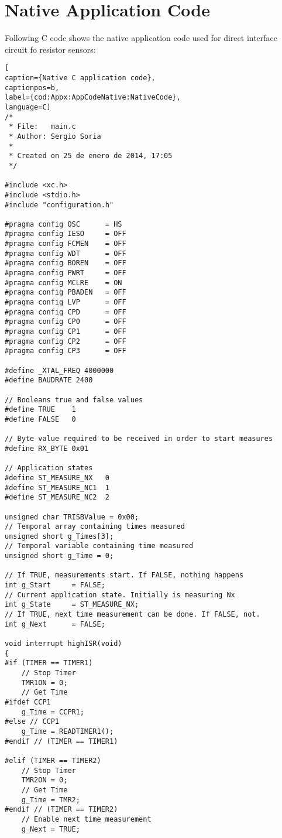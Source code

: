 \chapter{Native Application Code}\label{Appx:AppCodeNative}
Following C code shows the native application code used for direct interface circuit fo resistor sensors:
\medskip
\begin{lstlisting}[
caption={Native C application code},
captionpos=b,
label={cod:Appx:AppCodeNative:NativeCode},
language=C]
/*
 * File:   main.c
 * Author: Sergio Soria
 *
 * Created on 25 de enero de 2014, 17:05
 */

#include <xc.h>
#include <stdio.h>
#include "configuration.h"

#pragma config OSC      = HS
#pragma config IESO     = OFF
#pragma config FCMEN    = OFF
#pragma config WDT      = OFF
#pragma config BOREN    = OFF
#pragma config PWRT     = OFF
#pragma config MCLRE    = ON
#pragma config PBADEN   = OFF
#pragma config LVP      = OFF
#pragma config CPD      = OFF
#pragma config CP0      = OFF
#pragma config CP1      = OFF
#pragma config CP2      = OFF
#pragma config CP3      = OFF

#define _XTAL_FREQ 4000000
#define BAUDRATE 2400

// Booleans true and false values
#define TRUE    1
#define FALSE   0

// Byte value required to be received in order to start measures
#define RX_BYTE 0x01

// Application states
#define ST_MEASURE_NX   0
#define ST_MEASURE_NC1  1
#define ST_MEASURE_NC2  2

unsigned char TRISBValue = 0x00;
// Temporal array containing times measured
unsigned short g_Times[3];
// Temporal variable containing time measured
unsigned short g_Time = 0;

// If TRUE, measurements start. If FALSE, nothing happens
int g_Start     = FALSE;
// Current application state. Initially is measuring Nx
int g_State     = ST_MEASURE_NX;
// If TRUE, next time measurement can be done. If FALSE, not.
int g_Next      = FALSE;

void interrupt highISR(void)
{
#if (TIMER == TIMER1)
    // Stop Timer
    TMR1ON = 0;
    // Get Time
#ifdef CCP1
    g_Time = CCPR1;
#else // CCP1
    g_Time = READTIMER1();
#endif // (TIMER == TIMER1)

#elif (TIMER == TIMER2)
    // Stop Timer
    TMR2ON = 0;
    // Get Time
    g_Time = TMR2;
#endif // (TIMER == TIMER2)
    // Enable next time measurement
    g_Next = TRUE;


\end{lstlisting}
